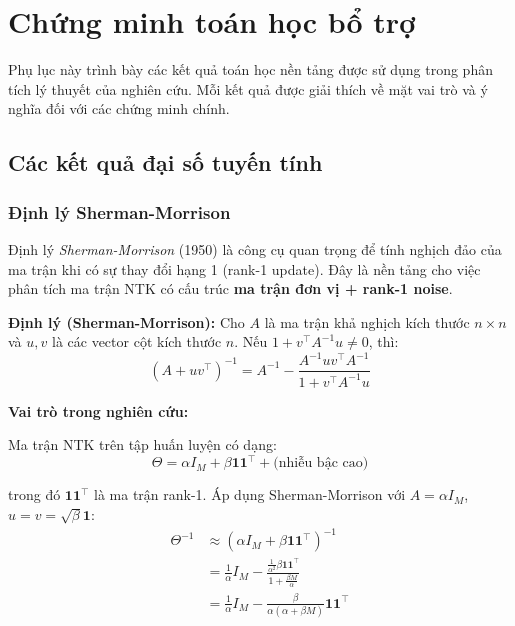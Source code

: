 \appendix

\chapter{Chứng minh toán học bổ trợ}

Phụ lục này trình bày các kết quả toán học nền tảng được sử dụng trong phân tích lý thuyết của nghiên cứu. Mỗi kết quả được giải thích về mặt vai trò và ý nghĩa đối với các chứng minh chính.

\section{Các kết quả đại số tuyến tính}

\subsection{Định lý Sherman-Morrison}

Định lý \textit{Sherman-Morrison} (1950) là công cụ quan trọng để tính nghịch đảo của ma trận khi có sự thay đổi hạng 1 (rank-1 update). Đây là nền tảng cho việc phân tích ma trận NTK có cấu trúc \textbf{ma trận đơn vị + rank-1 noise}.

\textbf{Định lý (Sherman-Morrison):} Cho $A$ là ma trận khả nghịch kích thước $n \times n$ và $u, v$ là các vector cột kích thước $n$. Nếu $1 + v^\top A^{-1} u \neq 0$, thì:
\begin{equation}
    (A + uv^\top)^{-1} = A^{-1} - \frac{A^{-1} u v^\top A^{-1}}{1 + v^\top A^{-1} u}
\end{equation}

\textbf{Vai trò trong nghiên cứu:}

Ma trận NTK trên tập huấn luyện có dạng:
\begin{equation}
    \Theta = \alpha I_M + \beta \mathbf{1}\mathbf{1}^\top + \text{(nhiễu bậc cao)}
\end{equation}

trong đó $\mathbf{1}\mathbf{1}^\top$ là ma trận rank-1. Áp dụng Sherman-Morrison với $A = \alpha I_M$, $u = v = \sqrt{\beta}\mathbf{1}$:
\begin{align}
    \Theta^{-1} &\approx (\alpha I_M + \beta \mathbf{1}\mathbf{1}^\top)^{-1} \\
    &= \frac{1}{\alpha} I_M - \frac{\frac{1}{\alpha^2} \beta \mathbf{1}\mathbf{1}^\top}{1 + \frac{\beta M}{\alpha}} \\
    &= \frac{1}{\alpha} I_M - \frac{\beta}{\alpha(\alpha + \beta M)} \mathbf{1}\mathbf{1}^\top
\end{align}


